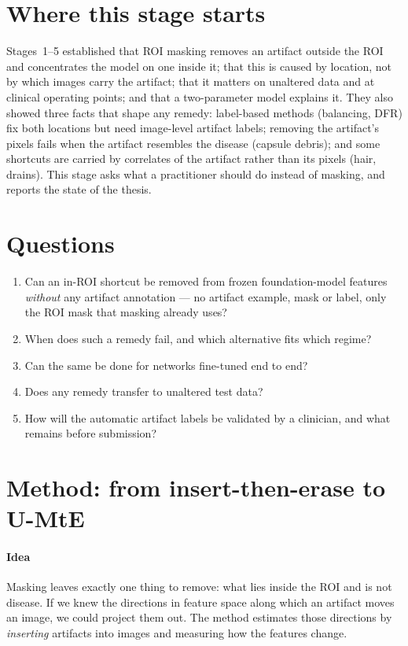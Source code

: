 \section{Where this stage starts}
Stages~1--5 established that ROI masking removes an artifact outside the ROI and concentrates the model on one inside
it; that this is caused by location, not by which images carry the artifact; that it matters on unaltered data and at
clinical operating points; and that a two-parameter model explains it. They also showed three facts that shape any
remedy: label-based methods (balancing, DFR) fix both locations but need image-level artifact labels; removing the
artifact's pixels fails when the artifact resembles the disease (capsule debris); and some shortcuts are carried by
correlates of the artifact rather than its pixels (hair, drains). This stage asks what a practitioner should do instead
of masking, and reports the state of the thesis.

\section{Questions}
\begin{enumerate}[label=\textbf{Q6\alph*},leftmargin=*]\itemsep1pt
\item Can an in-ROI shortcut be removed from frozen foundation-model features \emph{without} any artifact annotation ---
no artifact example, mask or label, only the ROI mask that masking already uses?
\item When does such a remedy fail, and which alternative fits which regime?
\item Can the same be done for networks fine-tuned end to end?
\item Does any remedy transfer to unaltered test data?
\item How will the automatic artifact labels be validated by a clinician, and what remains before submission?
\end{enumerate}

\section{Method: from insert-then-erase to U-MtE}\label{sec:method}
\paragraph{Idea} Masking leaves exactly one thing to remove: what lies inside the ROI and is not disease. If we knew
the directions in feature space along which an artifact moves an image, we could project them out. The method estimates
those directions by \emph{inserting} artifacts into images and measuring how the features change.

